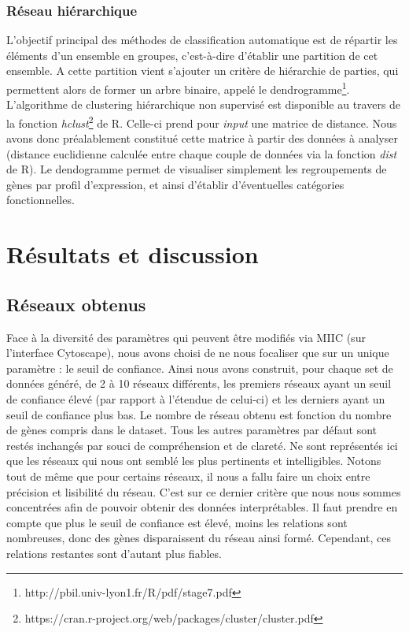 \documentclass[fleqn,11pt]{SelfArx} %
\begin{document}
\subsubsection{Réseau hiérarchique}
L’objectif principal des méthodes de classification automatique est de répartir les éléments d’un ensemble en groupes, c’est-à-dire d’établir une partition de cet ensemble.
A cette partition vient s'ajouter un critère de hiérarchie de parties, qui permettent alors de former un arbre binaire, appelé le dendrogramme\footnote{http://pbil.univ-lyon1.fr/R/pdf/stage7.pdf}. L'algorithme de clustering hiérarchique non supervisé est disponible au travers de la fonction \textit{hclust}\footnote{https://cran.r-project.org/web/packages/cluster/cluster.pdf} de R. Celle-ci prend pour \textit{input} une matrice de distance. Nous avons donc préalablement constitué cette matrice à partir des données à analyser (distance euclidienne calculée entre chaque couple de données via la fonction \textit{dist} de R). Le dendogramme permet de visualiser simplement les regroupements de gènes par profil d'expression, et ainsi d'établir d'éventuelles catégories fonctionnelles.



\section{Résultats et discussion}
 
\subsection{Réseaux obtenus}
Face à la diversité des paramètres qui peuvent être modifiés via MIIC (sur l'interface Cytoscape), nous avons choisi de ne nous focaliser que sur un unique paramètre : le seuil de confiance. Ainsi nous avons construit, pour chaque set de données généré, de 2 à 10 réseaux différents, les premiers réseaux ayant un seuil de confiance élevé (par rapport à l'étendue de celui-ci) et les derniers ayant un seuil de confiance plus bas. Le nombre de réseau obtenu est fonction du nombre de gènes compris dans le dataset. Tous les autres paramètres par défaut sont restés inchangés par souci de compréhension et de clareté. Ne sont représentés ici que les réseaux qui nous ont semblé les plus pertinents et intelligibles. Notons tout de même que pour certains réseaux, il nous a fallu faire un choix entre précision et lisibilité du réseau. C'est sur ce dernier critère que nous nous sommes concentrées afin de pouvoir obtenir des données interprétables. Il faut prendre en compte que plus le seuil de confiance est élevé, moins les relations sont nombreuses, donc des gènes disparaissent du réseau ainsi formé. Cependant, ces relations restantes sont d'autant plus fiables. 
\end{document}
